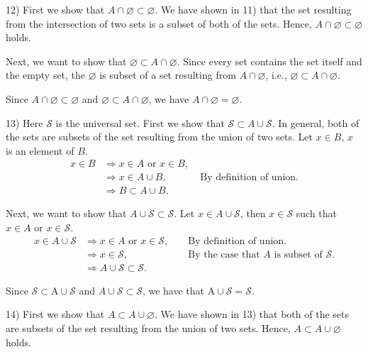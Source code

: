 \documentclass[12pt,thmsa]{article}
\begin{document}
\medskip

12) First we show that \(A \cap  \varnothing \subset \varnothing\). We have shown in 11) that the set resulting from the intersection of two sets is a subset of both of the sets. Hence, \(A \cap  \varnothing \subset \varnothing\) holds.

Next, we want to show that \( \varnothing \subset A \cap  \varnothing \). Since every set contains the set itself and the empty set, the \( \varnothing \) is subset of a set resulting from \(A \cap  \varnothing \), i.e., \( \varnothing \subset A \cap  \varnothing \).

Since \(A \cap  \varnothing \subset \varnothing\) and \( \varnothing \subset A \cap  \varnothing \), we have \( A \cap  \varnothing = \varnothing \).

\medskip


13)
Here \(\mathcal{S}\) is the universal set.
First we show that \(\mathcal{S} \subset A \cup  \mathcal{S}\). In general, both of the sets are subsets of the set resulting from the union of two sets. Let \(x \in B \), \(x\) is an element of \(B \).
\[\begin{aligned} 
 x \in B & \Rightarrow x \in A \text{ or } x \in B, \\
 & \Rightarrow x \in A \cup B, \qquad \quad \text{ By definition of union.}\\
 & \Rightarrow B \subset A \cup B.
\end{aligned}\]

Next, we want to show that \( A \cup  \mathcal{S} \subset \mathcal{S} \).
Let \(x \in A \cup  \mathcal{S}\), then \(x \in  \mathcal{S}\) such that \(x \in A \text{ or } x \in \mathcal{S} \). 
\[\begin{aligned} 
 x \in A \cup  \mathcal{S} & \Rightarrow x \in A \text{ or } x \in \mathcal{S}, & & \text{ By definition of union.}\\
 & \Rightarrow x \in \mathcal{S},  & & \text{ By the case that } A \text{ is subset of } \mathcal{S}.\\
 & \Rightarrow A \cup  \mathcal{S} \subset \mathcal{S}.
\end{aligned}\]

Since \(\mathcal{S} \subset \mathrm{A} \cup \mathcal{S}\) and \(A \cup \mathcal{S} \subset \mathcal{S}\), we have that \(\mathrm{A} \cup \mathcal{S}=\mathcal{S}\).

\medskip

14)
First we show that \(A \subset A \cup \varnothing\). We have shown in 13) that both of the sets are subsets of the set resulting from the union of two sets. Hence, \(A \subset A \cup \varnothing\) holds.
\end{document}
